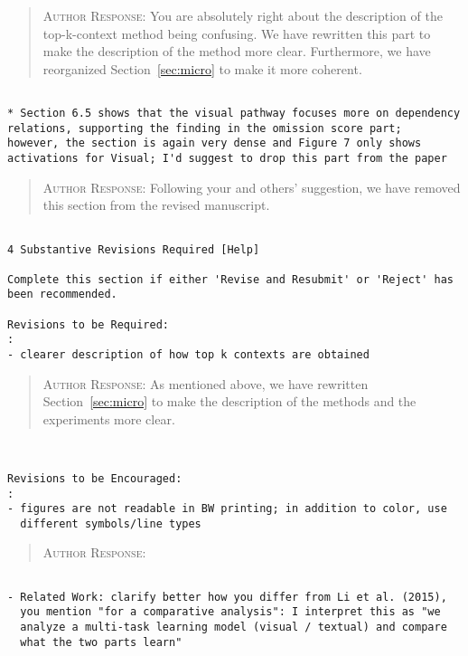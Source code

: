 \begin{quote}
\textsc{Author Response:}  You are absolutely right about the description of 
the top-k-context method being confusing. We have rewritten this part to make the description of the method more clear. Furthermore, we have reorganized 
Section~\ref{sec:micro} to make it more coherent. 
\end{quote}
\begin{verbatim}

* Section 6.5 shows that the visual pathway focuses more on dependency
relations, supporting the finding in the omission score part;
however, the section is again very dense and Figure 7 only shows
activations for Visual; I'd suggest to drop this part from the paper

\end{verbatim}  
\begin{quote}
\textsc{Author Response:}  Following your and others' suggestion, we have removed this section from the revised manuscript.
\end{quote}
\begin{verbatim}

4 Substantive Revisions Required [Help]

Complete this section if either 'Revise and Resubmit' or 'Reject' has
been recommended.

Revisions to be Required:
: 
- clearer description of how top k contexts are obtained
\end{verbatim}  
\begin{quote}
\textsc{Author Response:}  As mentioned above, we have rewritten Section~\ref{sec:micro} to make the description of the methods and the experiments more clear.
\end{quote}
\begin{verbatim}


Revisions to be Encouraged:
: 
- figures are not readable in BW printing; in addition to color, use
  different symbols/line types
\end{verbatim}  
\begin{quote}
\textsc{Author Response:}  
\end{quote}
\begin{verbatim}

- Related Work: clarify better how you differ from Li et al. (2015),
  you mention "for a comparative analysis": I interpret this as "we
  analyze a multi-task learning model (visual / textual) and compare
  what the two parts learn"
\end{verbatim}  
